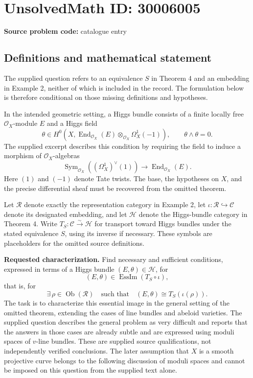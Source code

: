 \documentclass[11pt]{article}
\begin{document}
\section*{UnsolvedMath ID: 30006005}
\textbf{Source problem code:} catalogue entry
\subsection{Definitions and mathematical statement}
The supplied question refers to an equivalence \(S\) in Theorem 4 and an embedding in Example 2, neither of which is included in the record. The formulation below is therefore conditional on those missing definitions and hypotheses.

In the intended geometric setting, a Higgs bundle consists of a finite locally free \(\mathcal O_X\)-module \(E\) and a Higgs field
\[
\theta\in H^0\!\left(X,\operatorname{End}_{\mathcal O_X}(E)\otimes_{\mathcal O_X}\Omega_X^1(-1)\right),
\qquad \theta\wedge\theta=0.
\]
The supplied excerpt describes this condition by requiring the field to induce a morphism of \(\mathcal O_X\)-algebras
\[
\operatorname{Sym}_{\mathcal O_X}\!\left((\Omega_X^1)^\vee(1)\right)
\longrightarrow \operatorname{End}_{\mathcal O_X}(E).
\]
Here \((1)\) and \((-1)\) denote Tate twists. The base, the hypotheses on \(X\), and the precise differential sheaf must be recovered from the omitted theorem.

Let \(\mathcal R\) denote exactly the representation category in Example 2, let \(\iota:\mathcal R\hookrightarrow\mathcal C\) denote its designated embedding, and let \(\mathcal H\) denote the Higgs-bundle category in Theorem 4. Write \(T_S:\mathcal C\xrightarrow{\sim}\mathcal H\) for transport toward Higgs bundles under the stated equivalence \(S\), using its inverse if necessary. These symbols are placeholders for the omitted source definitions.

\textbf{Requested characterization.} Find necessary and sufficient conditions, expressed in terms of a Higgs bundle \((E,\theta)\in\mathcal H\), for
\[
(E,\theta)\in\operatorname{EssIm}(T_S\circ\iota),
\]
that is, for
\[
\exists\,\rho\in\operatorname{Ob}(\mathcal R)
\quad\text{such that}\quad
(E,\theta)\cong T_S(\iota(\rho)).
\]
The task is to characterize this essential image in the general setting of the omitted theorem, extending the cases of line bundles and abeloid varieties. The supplied question describes the general problem as very difficult and reports that the answers in those cases are already subtle and are expressed using moduli spaces of \(v\)-line bundles. These are supplied source qualifications, not independently verified conclusions. The later assumption that \(X\) is a smooth projective curve belongs to the following discussion of moduli spaces and cannot be imposed on this question from the supplied text alone.
\end{document}
